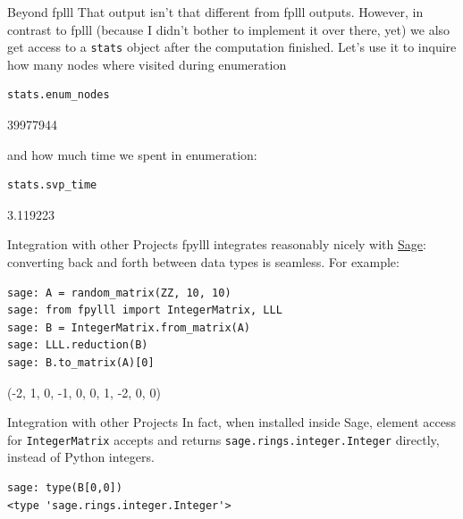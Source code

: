 \documentclass[presentation,smaller]{beamer}
\begin{document}
\begin{frame}[fragile,label={sec:orgheadline25}]{Beyond fplll}
 That output isn’t that different from \alert{fplll} outputs. However, in contrast to \alert{fplll} (because I didn’t bother to implement it over there, yet) we also get access to a \texttt{stats} object after the computation finished. Let’s use it to inquire how many nodes where visited during enumeration

\lstset{language=Python,label= ,caption= ,captionpos=b,numbers=none}
\begin{lstlisting}
stats.enum_nodes
\end{lstlisting}

39977944

and how much time we spent in enumeration:

\lstset{language=Python,label= ,caption= ,captionpos=b,numbers=none}
\begin{lstlisting}
stats.svp_time
\end{lstlisting}

3.119223
\end{frame}

\begin{frame}[fragile,label={sec:orgheadline26}]{Integration with other Projects}
 \alert{fpylll} integrates reasonably nicely with \href{http://sagemath.org}{Sage}: converting back and forth between data types is seamless. For example:

\lstset{language=sage,label= ,caption= ,captionpos=b,numbers=none}
\begin{lstlisting}
sage: A = random_matrix(ZZ, 10, 10)
sage: from fpylll import IntegerMatrix, LLL
sage: B = IntegerMatrix.from_matrix(A)
sage: LLL.reduction(B)
sage: B.to_matrix(A)[0]
\end{lstlisting}
(-2, 1, 0, -1, 0, 0, 1, -2, 0, 0)
\end{frame}

\begin{frame}[fragile,label={sec:orgheadline27}]{Integration with other Projects}
 In fact, when installed inside Sage, element access for \texttt{IntegerMatrix} accepts and returns \texttt{sage.rings.integer.Integer} directly, instead of Python integers.

\lstset{language=sage,label= ,caption= ,captionpos=b,numbers=none}
\begin{lstlisting}
sage: type(B[0,0])
<type 'sage.rings.integer.Integer'>
\end{lstlisting}
\end{frame}
\end{document}
